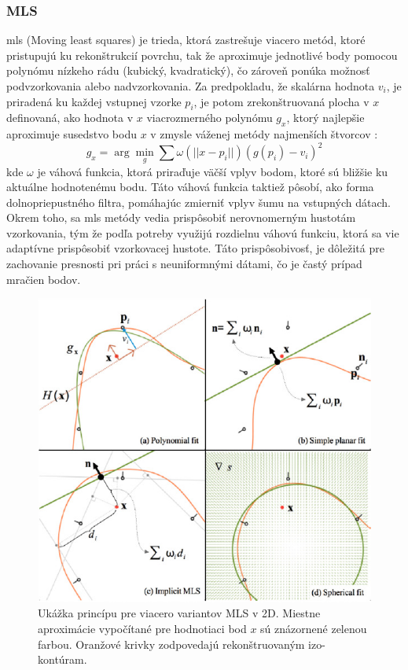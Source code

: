 \subsubsection{MLS}
\noindent \acrshort{mls} (Moving least squares) je trieda, ktorá zastrešuje viacero metód, ktoré pristupujú ku rekonštrukcií povrchu, tak že aproximuje jednotlivé body pomocou polynómu nízkeho rádu (kubický, kvadratický), čo zároveň ponúka možnosť podvzorkovania alebo nadvzorkovania. \cite{MLS_survey}
\newline\indent Za predpokladu, že skalárna hodnota $v_i$, je priradená ku každej vstupnej vzorke $p_i$, je potom zrekonštruovaná plocha v $x$ definovaná, ako hodnota v $x$ viacrozmerného polynómu $g_x$, ktorý najlepšie aproximuje susedstvo bodu $x$ v zmysle váženej metódy najmenších štvorcov \cite{MLS_survey}:
\begin{equation}
    g_x = \arg\min_{g}\sum\omega(||x-p_i||)(g(p_i)-v_i)^2
    \label{eq:mls}
\end{equation}
\indent kde $\omega$ je váhová funkcia, ktorá priraďuje väčší vplyv bodom, ktoré sú bližšie ku aktuálne hodnotenému bodu. Táto váhová funkcia taktiež pôsobí, ako forma dolnopriepustného filtra, pomáhajúc zmierniť vplyv šumu na vstupných dátach. Okrem toho, sa \acrshort{mls} metódy vedia prispôsobiť nerovnomerným hustotám vzorkovania, tým že podľa potreby využijú rozdielnu váhovú funkciu, ktorá sa vie adaptívne prispôsobiť vzorkovacej hustote. Táto prispôsobivosť, je dôležitá pre zachovanie presnosti pri práci s neuniformnými dátami, čo je častý prípad mračien bodov. \cite{MLS_survey}
\begin{figure}[!htbp]
  \centering
  \includegraphics[width=13cm]{img/MLS.jpg}
  \caption{Ukážka princípu pre viacero variantov MLS v 2D. Miestne aproximácie vypočítané pre hodnotiaci bod $x$ sú znázornené zelenou farbou. Oranžové krivky zodpovedajú rekonštruovaným izo-kontúram. \cite{MLS_survey}} 
  \label{fig:MLS}
\end{figure} 

